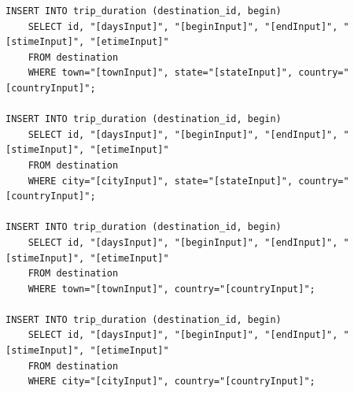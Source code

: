 \documentclass[letterpaper,10pt,onecolumn,compsoc]{IEEEtran}
\begin{document}
\begin{verbatim}
INSERT INTO trip_duration (destination_id, begin) 
	SELECT id, "[daysInput]", "[beginInput]", "[endInput]", "[stimeInput]", "[etimeInput]" 
	FROM destination 
	WHERE town="[townInput]", state="[stateInput]", country="[countryInput]";
	
INSERT INTO trip_duration (destination_id, begin) 
	SELECT id, "[daysInput]", "[beginInput]", "[endInput]", "[stimeInput]", "[etimeInput]" 
	FROM destination 
	WHERE city="[cityInput]", state="[stateInput]", country="[countryInput]";
	
INSERT INTO trip_duration (destination_id, begin) 
	SELECT id, "[daysInput]", "[beginInput]", "[endInput]", "[stimeInput]", "[etimeInput]" 
	FROM destination 
	WHERE town="[townInput]", country="[countryInput]";
	
INSERT INTO trip_duration (destination_id, begin) 
	SELECT id, "[daysInput]", "[beginInput]", "[endInput]", "[stimeInput]", "[etimeInput]" 
	FROM destination 
	WHERE city="[cityInput]", country="[countryInput]";
\end{verbatim}

\newpage
\end{document}
